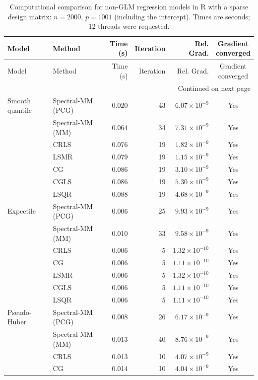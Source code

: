\begingroup
\small
\setlength{\tabcolsep}{4pt}
\begin{longtable}{llrrrc}
\caption{Computational comparison for non-GLM regression models in R with a sparse design matrix: $n=2000$, $p=1001$ (including the intercept). Times are seconds; 12 threads were requested.}
\label{tab:R-sparse-nonglm-initial}\\
\toprule
Model & Method & Time (s) & Iteration & Rel. Grad. & \shortstack{Gradient\\converged} \\
\midrule
\endfirsthead
\toprule
Model & Method & Time (s) & Iteration & Rel. Grad. & \shortstack{Gradient\\converged} \\
\midrule
\endhead
\midrule
\multicolumn{6}{r}{Continued on next page}\\
\endfoot
\bottomrule
\endlastfoot
Smooth quantile & Spectral-MM (PCG) & 0.020 & 43 & $6.07\times10^{-9}$ & Yes \\
 & Spectral-MM (MM) & 0.064 & 34 & $7.31\times10^{-9}$ & Yes \\
 & CRLS & 0.076 & 19 & $1.82\times10^{-9}$ & Yes \\
 & LSMR & 0.079 & 19 & $1.15\times10^{-9}$ & Yes \\
 & CG & 0.086 & 19 & $3.10\times10^{-9}$ & Yes \\
 & CGLS & 0.086 & 19 & $5.30\times10^{-9}$ & Yes \\
 & LSQR & 0.088 & 19 & $4.68\times10^{-9}$ & Yes \\
\midrule
Expectile & Spectral-MM (PCG) & 0.006 & 25 & $9.93\times10^{-9}$ & Yes \\
 & Spectral-MM (MM) & 0.010 & 33 & $9.58\times10^{-9}$ & Yes \\
 & CRLS & 0.006 & 5 & $1.32\times10^{-10}$ & Yes \\
 & CG & 0.006 & 5 & $1.11\times10^{-10}$ & Yes \\
 & LSMR & 0.006 & 5 & $1.32\times10^{-10}$ & Yes \\
 & CGLS & 0.006 & 5 & $1.11\times10^{-10}$ & Yes \\
 & LSQR & 0.006 & 5 & $1.11\times10^{-10}$ & Yes \\
\midrule
Pseudo-Huber & Spectral-MM (PCG) & 0.008 & 26 & $6.17\times10^{-9}$ & Yes \\
 & Spectral-MM (MM) & 0.013 & 40 & $8.76\times10^{-9}$ & Yes \\
 & CRLS & 0.013 & 10 & $4.07\times10^{-9}$ & Yes \\
 & CG & 0.014 & 10 & $4.04\times10^{-9}$ & Yes \\

\end{longtable}
